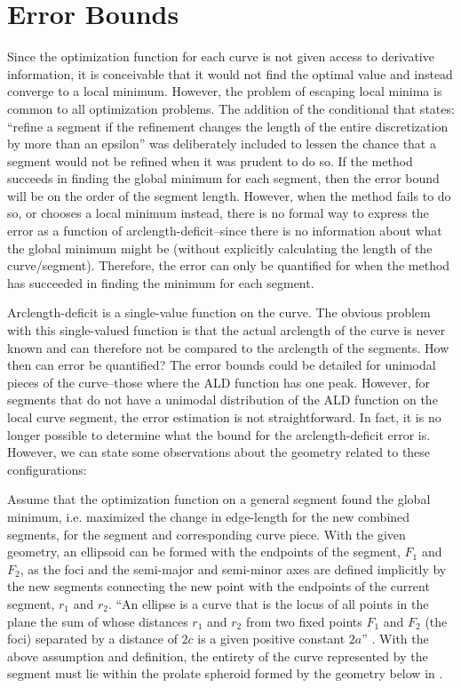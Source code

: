 \section{Error Bounds}
Since the optimization function for each curve is not given access to 
derivative information, it is conceivable that it would not find the 
optimal value and instead converge to a local minimum.  However, the 
problem of escaping local minima is common to all optimization problems.  
The addition of the conditional that states: ``refine a segment if the 
refinement changes the length of the entire discretization by more than an 
epsilon'' was deliberately included to lessen the chance that a segment 
would not be refined when it was prudent to do so.  If the method succeeds 
in finding the global minimum for each segment, then the error bound will 
be on the order of the segment length.  However, when the method fails to 
do so, or chooses a local minimum instead, there is no formal way to 
express the error as a function of arclength-deficit--since there is no 
information about what the global minimum might be (without explicitly 
calculating the length of the curve/segment).  Therefore, the error can 
only be quantified for when the method has succeeded in finding the 
minimum for each segment.

Arclength-deficit is a single-value function on the curve.  The obvious 
problem with this single-valued function is that the actual arclength of 
the curve is never known and can therefore not be compared to the 
arclength of the segments.  How then can error be quantified? The error 
bounds could be detailed for unimodal pieces of the curve--those where the 
ALD function has one peak.  However, for segments that do not have a 
unimodal distribution of the ALD function on the local curve segment, the 
error estimation is not straightforward.  In fact, it is no longer 
possible to determine what the bound for the arclength-deficit error is.  
However, we can state some observations about the geometry related to 
these configurations:

Assume that the optimization function on a general segment found the global minimum, i.e. maximized the change in edge-length for the new combined segments, for the segment and corresponding curve piece.  With the given geometry, an ellipsoid can be formed with the endpoints of the segment, $F_1$ and $F_2$, as the foci and the semi-major and semi-minor axes are defined implicitly by the new segments connecting the new point with the endpoints of the current segment, $r_1$ and $r_2$.  ``An ellipse is a curve that is the locus of all points in the plane the sum of whose distances $r_1$ and $r_2$ from two fixed points $F_1$ and $F_2$ (the foci) separated by a distance of $2c$ is a given positive constant $2a$'' \cite{weissteineEllipse}.  With the above assumption and definition, the entirety of the curve represented by the segment must lie within the prolate spheroid  formed by the geometry below in .

